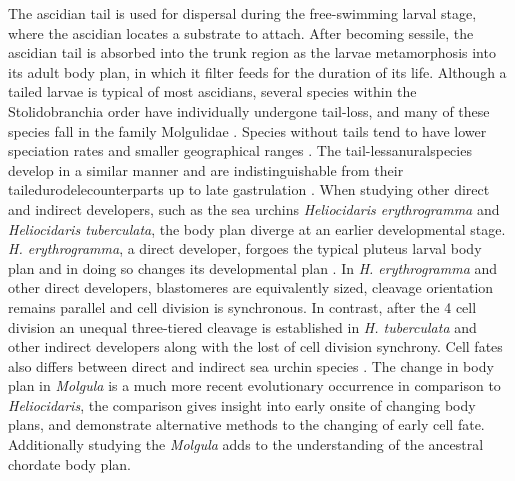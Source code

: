 The ascidian tail is used for dispersal during the free-swimming larval stage, where the ascidian locates a substrate to attach. After becoming sessile, the ascidian tail is absorbed into the trunk region as the larvae metamorphosis into its adult body plan, in which it filter feeds for the duration of its life. Although a tailed larvae is typical of most ascidians, several species within the Stolidobranchia order have individually undergone tail-loss, and many of these species fall in the family Molgulidae \cite{berrill_studies_1931, jeffery_evolution_1999, huber_evolution_2000, maliska_molgula_2010}. Species without tails tend to have lower speciation rates and smaller geographical ranges \cite{maliska_developmental_2013}. The tail-less\textemdash anural\textemdash species develop in a similar manner and are indistinguishable from their tailed\textemdash urodele\textemdash counterparts up to late gastrulation \cite{berrill_studies_1931, swalla_interspecific_1990, jeffery_factors_1992}. When studying other direct and indirect developers, such as the sea urchins \textit{Heliocidaris erythrogramma} and  \textit{Heliocidaris tuberculata}, the body plan diverge at an earlier developmental stage. \textit{H. erythrogramma}, a direct developer, forgoes the typical pluteus larval body plan and in doing so changes its developmental plan \cite{henry_evolutionary_1990}. In \textit{H. erythrogramma} and other direct developers, blastomeres are equivalently sized, cleavage orientation remains parallel and cell division is synchronous. In contrast, after the 4 cell division an unequal three-tiered cleavage is established in \textit{H. tuberculata} and other indirect developers along with the lost of cell division synchrony. Cell fates also differs between direct and indirect sea urchin species \cite{wray_evolutionary_1989}. The change in body plan in \textit{Molgula} is a much more recent evolutionary occurrence in comparison to \textit{Heliocidaris}, %
the comparison gives insight into early onsite of changing body plans, and demonstrate alternative methods to the changing of early cell fate. Additionally studying the \textit{Molgula} adds to the understanding of the ancestral chordate body plan.  

